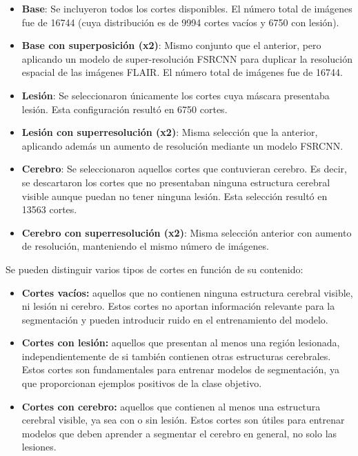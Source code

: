 \documentclass[../main.tex]{subfiles}
\begin{document}
\begin{itemize}
    \item \textbf{Base}: Se incluyeron todos los cortes disponibles. El número total de imágenes fue de 16744 (cuya distribución es de 9994 cortes vacíos y 6750 con lesión).
    \item \textbf{Base con superposición (x2)}: Mismo conjunto que el anterior, pero aplicando un modelo de super-resolución FSRCNN para duplicar la resolución espacial de las imágenes FLAIR. El número total de imágenes fue de 16744.
    \item \textbf{Lesión}: Se seleccionaron únicamente los cortes cuya máscara presentaba lesión. Esta configuración resultó en 6750 cortes.
    \item \textbf{Lesión con superresolución (x2)}: Misma selección que la anterior, aplicando además un aumento de resolución mediante un modelo FSRCNN.
    \item \textbf{Cerebro}: Se seleccionaron aquellos cortes que contuvieran cerebro. Es decir, se descartaron los cortes que no presentaban ninguna estructura cerebral visible aunque puedan no tener ninguna lesión. Esta selección resultó en 13563 cortes.
    \item \textbf{Cerebro con superresolución (x2)}: Misma selección anterior con aumento de resolución, manteniendo el mismo número de imágenes.
\end{itemize}

Se pueden distinguir varios tipos de cortes en función de su contenido:
\begin{itemize}
    \item \textbf{Cortes vacíos:} aquellos que no contienen ninguna estructura cerebral visible, ni lesión ni cerebro. Estos cortes no aportan información relevante para la segmentación y pueden introducir ruido en el entrenamiento del modelo.
    \item \textbf{Cortes con lesión:} aquellos que presentan al menos una región lesionada, independientemente de si también contienen otras estructuras cerebrales. Estos cortes son fundamentales para entrenar modelos de segmentación, ya que proporcionan ejemplos positivos de la clase objetivo.
    \item \textbf{Cortes con cerebro:} aquellos que contienen al menos una estructura cerebral visible, ya sea con o sin lesión. Estos cortes son útiles para entrenar modelos que deben aprender a segmentar el cerebro en general, no solo las lesiones.
\end{itemize}
\end{document}
